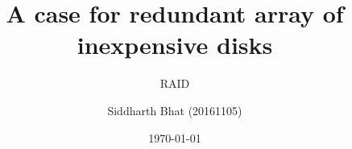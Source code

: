 \documentclass{beamer}
\title{A case for redundant array of inexpensive disks}
\subtitle{RAID}
\author{Siddharth Bhat (20161105)}
\date{\today}
\begin{document}
\begin{frame}
\titlepage
\end{frame}
\end{document}
